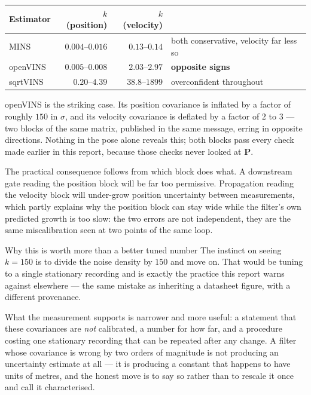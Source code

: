 \begin{center}
\begin{tabular}{@{}lrrl@{}}
\toprule
Estimator & $k$ (position) & $k$ (velocity) & \\
\midrule
MINS     & $0.004$--$0.016$ & $0.13$--$0.14$ & both conservative, velocity far less so \\
openVINS & $0.005$--$0.008$ & $\mathbf{2.03}$--$\mathbf{2.97}$ & \textbf{opposite signs} \\
sqrtVINS & $0.20$--$4.39$   & $38.8$--$1899$ & overconfident throughout \\
\bottomrule
\end{tabular}
\end{center}

\noindent openVINS is the striking case. Its position covariance is inflated
by a factor of roughly $150$ in $\sigma$, and its velocity covariance is
deflated by a factor of $2$ to $3$ --- two blocks of the same matrix,
published in the same message, erring in opposite directions. Nothing in the
pose alone reveals this; both blocks pass every check made earlier in this
report, because those checks never looked at $\mathbf{P}$.

The practical consequence follows from which block does what. A downstream
gate reading the position block will be far too permissive. Propagation
reading the velocity block will under-grow position uncertainty between
measurements, which partly explains why the position block can stay wide
while the filter's own predicted growth is too slow: the two errors are not
independent, they are the same miscalibration seen at two points of the same
loop.

\begin{trapbox}{Why this is worth more than a better tuned number}
The instinct on seeing $k=150$ is to divide the noise density by $150$ and
move on. That would be tuning to a single stationary recording and is
exactly the practice this report warns against elsewhere --- the same
mistake as inheriting a datasheet figure, with a different provenance.

What the measurement supports is narrower and more useful: a statement that
these covariances are \emph{not} calibrated, a number for how far, and a
procedure costing one stationary recording that can be repeated after any
change. A filter whose covariance is wrong by two orders of magnitude is not
producing an uncertainty estimate at all --- it is producing a constant that
happens to have units of metres, and the honest move is to say so rather
than to rescale it once and call it characterised.
\end{trapbox}

